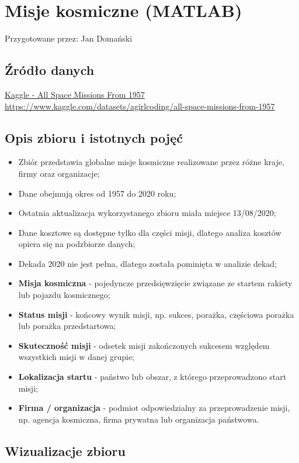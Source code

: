 \documentclass[12pt]{article}
\begin{document}
\newpage
\section{Misje kosmiczne (MATLAB)}

Przygotowane przez: Jan Domański

\subsection{Źródło danych}
\href{https://www.kaggle.com/datasets/agirlcoding/all-space-missions-from-1957}
{Kaggle - All Space Missions From 1957} \\
\url{https://www.kaggle.com/datasets/agirlcoding/all-space-missions-from-1957}

\subsection{Opis zbioru i istotnych pojęć}
\begin{itemize}
    \item Zbiór przedstawia globalne misje kosmiczne realizowane przez różne kraje, firmy oraz organizacje;
    \item Dane obejmują okres od 1957 do 2020 roku;
    \item Ostatnia aktualizacja wykorzystanego zbioru miała miejsce 13/08/2020;
    \item Dane kosztowe są dostępne tylko dla części misji, dlatego analiza kosztów opiera się na podzbiorze danych;
    \item Dekada 2020 nie jest pełna, dlatego została pominięta w analizie dekad;
    \item \textbf{Misja kosmiczna} - pojedyncze przedsięwzięcie związane ze startem rakiety lub pojazdu kosmicznego;
    \item \textbf{Status misji} - końcowy wynik misji, np. sukces, porażka, częściowa porażka lub porażka przedstartowa;
    \item \textbf{Skuteczność misji} - odsetek misji zakończonych sukcesem względem wszystkich misji w danej grupie;
    \item \textbf{Lokalizacja startu} - państwo lub obszar, z którego przeprowadzono start misji;
    \item \textbf{Firma / organizacja} - podmiot odpowiedzialny za przeprowadzenie misji, np. agencja kosmiczna, firma prywatna lub organizacja państwowa.
\end{itemize}


\subsection{Wizualizacje zbioru}
\end{document}
